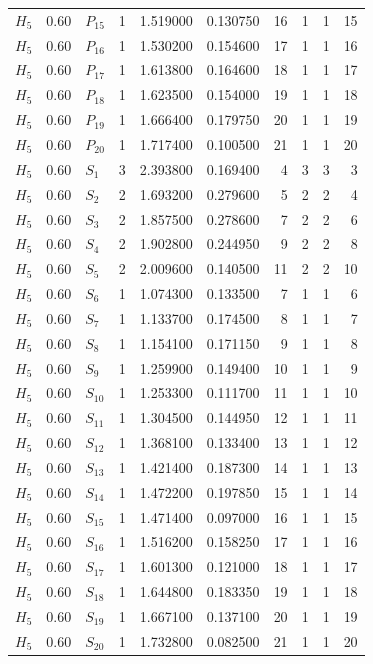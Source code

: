\begin{longtable}{lrlrrrrrrr}
$H_5$ & 0.60 & $P_{15}$ & 1 & 1.519000 & 0.130750 & 16 & 1 & 1 & 15\\
$H_5$ & 0.60 & $P_{16}$ & 1 & 1.530200 & 0.154600 & 17 & 1 & 1 & 16\\
$H_5$ & 0.60 & $P_{17}$ & 1 & 1.613800 & 0.164600 & 18 & 1 & 1 & 17\\
$H_5$ & 0.60 & $P_{18}$ & 1 & 1.623500 & 0.154000 & 19 & 1 & 1 & 18\\
$H_5$ & 0.60 & $P_{19}$ & 1 & 1.666400 & 0.179750 & 20 & 1 & 1 & 19\\
$H_5$ & 0.60 & $P_{20}$ & 1 & 1.717400 & 0.100500 & 21 & 1 & 1 & 20\\
$H_5$ & 0.60 & $S_{1}$ & 3 & 2.393800 & 0.169400 & 4 & 3 & 3 & 3\\
$H_5$ & 0.60 & $S_{2}$ & 2 & 1.693200 & 0.279600 & 5 & 2 & 2 & 4\\
$H_5$ & 0.60 & $S_{3}$ & 2 & 1.857500 & 0.278600 & 7 & 2 & 2 & 6\\
$H_5$ & 0.60 & $S_{4}$ & 2 & 1.902800 & 0.244950 & 9 & 2 & 2 & 8\\
$H_5$ & 0.60 & $S_{5}$ & 2 & 2.009600 & 0.140500 & 11 & 2 & 2 & 10\\
$H_5$ & 0.60 & $S_{6}$ & 1 & 1.074300 & 0.133500 & 7 & 1 & 1 & 6\\
$H_5$ & 0.60 & $S_{7}$ & 1 & 1.133700 & 0.174500 & 8 & 1 & 1 & 7\\
$H_5$ & 0.60 & $S_{8}$ & 1 & 1.154100 & 0.171150 & 9 & 1 & 1 & 8\\
$H_5$ & 0.60 & $S_{9}$ & 1 & 1.259900 & 0.149400 & 10 & 1 & 1 & 9\\
$H_5$ & 0.60 & $S_{10}$ & 1 & 1.253300 & 0.111700 & 11 & 1 & 1 & 10\\
$H_5$ & 0.60 & $S_{11}$ & 1 & 1.304500 & 0.144950 & 12 & 1 & 1 & 11\\
$H_5$ & 0.60 & $S_{12}$ & 1 & 1.368100 & 0.133400 & 13 & 1 & 1 & 12\\
$H_5$ & 0.60 & $S_{13}$ & 1 & 1.421400 & 0.187300 & 14 & 1 & 1 & 13\\
$H_5$ & 0.60 & $S_{14}$ & 1 & 1.472200 & 0.197850 & 15 & 1 & 1 & 14\\
$H_5$ & 0.60 & $S_{15}$ & 1 & 1.471400 & 0.097000 & 16 & 1 & 1 & 15\\
$H_5$ & 0.60 & $S_{16}$ & 1 & 1.516200 & 0.158250 & 17 & 1 & 1 & 16\\
$H_5$ & 0.60 & $S_{17}$ & 1 & 1.601300 & 0.121000 & 18 & 1 & 1 & 17\\
$H_5$ & 0.60 & $S_{18}$ & 1 & 1.644800 & 0.183350 & 19 & 1 & 1 & 18\\
$H_5$ & 0.60 & $S_{19}$ & 1 & 1.667100 & 0.137100 & 20 & 1 & 1 & 19\\
$H_5$ & 0.60 & $S_{20}$ & 1 & 1.732800 & 0.082500 & 21 & 1 & 1 & 20\\
\end{longtable}
\endgroup
